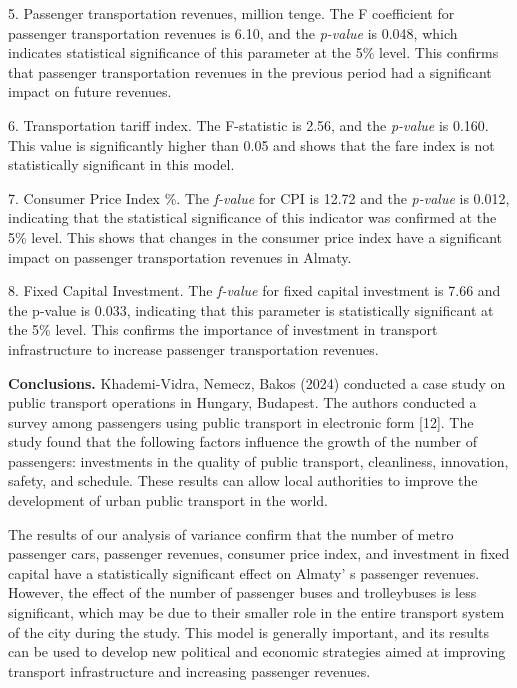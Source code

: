\begin{multicols}{2}
5. Passenger transportation revenues, million tenge. The F coefficient
for passenger transportation revenues is 6.10, and the \emph{p-value} is
0.048, which indicates statistical significance of this parameter at the
5\% level. This confirms that passenger transportation revenues in the
previous period had a significant impact on future revenues.

6. Transportation tariff index. The F-statistic is 2.56, and the
\emph{p-value} is 0.160. This value is significantly higher than 0.05
and shows that the fare index is not statistically significant in this
model.

7. Consumer Price Index \%. The \emph{f-value} for CPI is 12.72 and the
\emph{p-value} is 0.012, indicating that the statistical significance of
this indicator was confirmed at the 5\% level. This shows that changes
in the consumer price index have a significant impact on passenger
transportation revenues in Almaty.

8. Fixed Capital Investment. The \emph{f-value} for fixed capital
investment is 7.66 and the p-value is 0.033, indicating that this
parameter is statistically significant at the 5\% level. This confirms
the importance of investment in transport infrastructure to increase
passenger transportation revenues.

{\bfseries Conclusions.} Khademi-Vidra, Nemecz, Bakos (2024) conducted a
case study on public transport operations in Hungary, Budapest. The
authors conducted a survey among passengers using public transport in
electronic form {[}12{]}. The study found that the following factors
influence the growth of the number of passengers: investments in the
quality of public transport, cleanliness, innovation, safety, and
schedule. These results can allow local authorities to improve the
development of urban public transport in the world.

The results of our analysis of variance confirm that the number of metro
passenger cars, passenger revenues, consumer price index, and investment
in fixed capital have a statistically significant effect on
Almaty' s passenger revenues. However, the effect of the
number of passenger buses and trolleybuses is less significant, which
may be due to their smaller role in the entire transport system of the
city during the study. This model is generally important, and its
results can be used to develop new political and economic strategies
aimed at improving transport infrastructure and increasing passenger
revenues.


\end{multicols}
